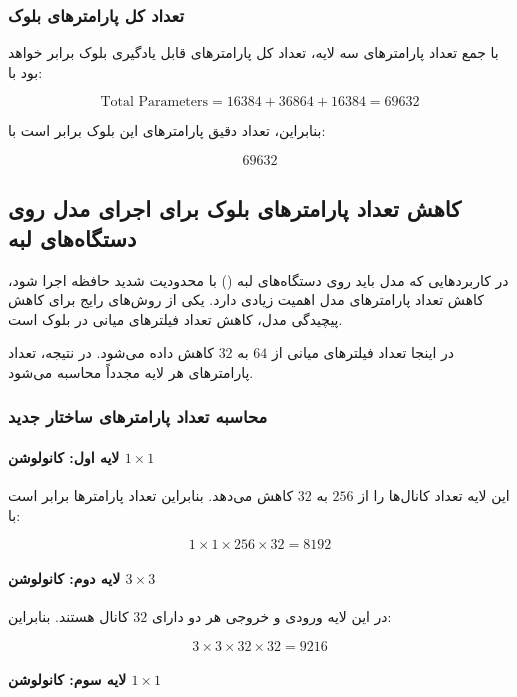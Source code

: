\documentclass{article}
\begin{document}
\subsubsection{تعداد کل پارامترهای بلوک}

با جمع تعداد پارامترهای سه لایه، تعداد کل پارامترهای قابل یادگیری بلوک  برابر خواهد بود با:

\[
\text{Total Parameters}
= 16384 + 36864 + 16384
= 69632
\]

بنابراین، تعداد دقیق پارامترهای این بلوک برابر است با:

\[
\boxed{69632}
\]
\subsection{کاهش تعداد پارامترهای بلوک  برای اجرای مدل روی دستگاه‌های لبه}

در کاربردهایی که مدل باید روی دستگاه‌های لبه () با محدودیت شدید حافظه اجرا شود، کاهش تعداد پارامترهای مدل اهمیت زیادی دارد. یکی از روش‌های رایج برای کاهش پیچیدگی مدل، کاهش تعداد فیلترهای میانی در بلوک  است.

در اینجا تعداد فیلترهای میانی از \(64\) به \(32\) کاهش داده می‌شود. در نتیجه، تعداد پارامترهای هر لایه مجدداً محاسبه می‌شود.

\subsubsection{محاسبه تعداد پارامترهای ساختار جدید}

\paragraph{لایه اول: کانولوشن \(1\times1\)}

این لایه تعداد کانال‌ها را از \(256\) به \(32\) کاهش می‌دهد. بنابراین تعداد پارامترها برابر است با:

\[
1 \times 1 \times 256 \times 32 = 8192
\]

\paragraph{لایه دوم: کانولوشن \(3\times3\)}

در این لایه ورودی و خروجی هر دو دارای \(32\) کانال هستند. بنابراین:

\[
3 \times 3 \times 32 \times 32 = 9216
\]

\paragraph{لایه سوم: کانولوشن \(1\times1\)}
\end{document}
